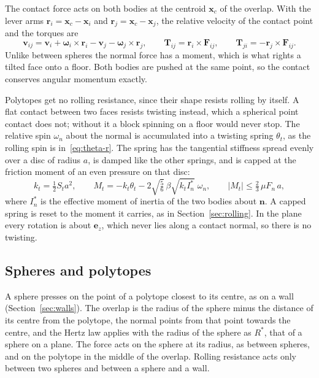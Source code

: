The contact force acts on both bodies at the centroid $\mathbf{x}_{c}$ of the overlap.
With the lever arms $\mathbf{r}_{i}=\mathbf{x}_{c}-\mathbf{x}_{i}$ and $\mathbf{r}_{j}=\mathbf{x}_{c}-\mathbf{x}_{j}$, the relative velocity of the contact point and the torques are
\begin{equation}
  \mathbf{v}_{ij} = \mathbf{v}_{i}+\boldsymbol{\omega}_{i}\times\mathbf{r}_{i}-\mathbf{v}_{j}-\boldsymbol{\omega}_{j}\times\mathbf{r}_{j},
  \qquad
  \mathbf{T}_{ij} = \mathbf{r}_{i}\times\mathbf{F}_{ij},
  \qquad
  \mathbf{T}_{ji} = -\mathbf{r}_{j}\times\mathbf{F}_{ij}.
  \label{eq:polytope-torque}
\end{equation}
Unlike between spheres the normal force has a moment, which is what rights a tilted face onto a floor.
Both bodies are pushed at the same point, so the contact conserves angular momentum exactly.

Polytopes get no rolling resistance, since their shape resists rolling by itself.
A flat contact between two faces resists twisting instead, which a spherical point contact does not; without it a block spinning on a floor would never stop.
The relative spin $\omega_{n}$ about the normal is accumulated into a twisting spring $\theta_{t}$, as the rolling spin is in~\eqref{eq:theta-r}.
The spring has the tangential stiffness spread evenly over a disc of radius $a$, is damped like the other springs, and is capped at the friction moment of an even pressure on that disc:
\begin{equation}
  k_{t} = \tfrac{1}{2}S_{t}a^{2},
  \qquad
  M_{t} = -k_{t}\theta_{t} - 2\sqrt{\tfrac{5}{6}}\,\beta\sqrt{k_{t}I^{*}_{n}}\;\omega_{n},
  \qquad
  \lvert M_{t}\rvert \le \tfrac{2}{3}\,\mu F_{n}\,a ,
  \label{eq:twisting}
\end{equation}
where $I^{*}_{n}$ is the effective moment of inertia of the two bodies about $\mathbf{n}$.
A capped spring is reset to the moment it carries, as in Section~\ref{sec:rolling}.
In the plane every rotation is about $\mathbf{e}_{z}$, which never lies along a contact normal, so there is no twisting.

\subsection{Spheres and polytopes}

A sphere presses on the point of a polytope closest to its centre, as on a wall (Section~\ref{sec:walls}).
The overlap is the radius of the sphere minus the distance of its centre from the polytope, the normal points from that point towards the centre, and the Hertz law applies with the radius of the sphere as $R^{*}$, that of a sphere on a plane.
The force acts on the sphere at its radius, as between spheres, and on the polytope in the middle of the overlap.
Rolling resistance acts only between two spheres and between a sphere and a wall.

